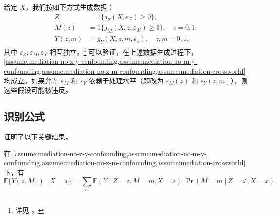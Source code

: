 \begin{Example}[验证假设的数据生成过程]\label{eg:mediation-assumptions}
给定 $X$，我们按如下方式生成数据：
\begin{align*}
Z &= 1\{ g_Z(X, \varepsilon_Z) \geq 0 \}, \\
M(z) &= 1\{ g_M(X, z, \varepsilon_M) \geq 0 \}, \quad z = 0, 1, \\
Y(z, m) &= g_Y(X, z, m, \varepsilon_Y), \quad z, m = 0, 1,
\end{align*}
其中 $\varepsilon_Z, \varepsilon_M, \varepsilon_Y$ 相互独立。\footnote{详见 \cite{robins2010treatment}。} 可以验证，在上述数据生成过程下，\cref{assume:mediation-no-z-y-confounding,assume:mediation-no-m-y-confounding,assume:mediation-no-z-m-confounding,assume:mediation-crossworld} 均成立。如果允许 $\varepsilon_M$ 和 $\varepsilon_Y$ 依赖于处理水平（即改为 $\varepsilon_M(z)$ 和 $\varepsilon_Y(z, m)$），则这些假设可能被违反。
\end{Example}

\subsection{识别公式}

 证明了以下关键结果。

\begin{Theorem}[中介公式]\label{eq:mediation-formula}
在 \cref{assume:mediation-no-z-y-confounding,assume:mediation-no-m-y-confounding,assume:mediation-no-z-m-confounding,assume:mediation-crossworld} 下，有
\[
\mathbb{E}\{ Y(z, M_{z'}) \mid X = x \}
= \sum_m \mathbb{E}(Y \mid Z = z, M = m, X = x) \; \Pr(M = m \mid Z = z', X = x).
\]
\end{Theorem}

\fboxsep=5pt\fboxrule=1pt
\noindent{}

\fboxsep=5pt\fboxrule=1pt
\noindent{}

